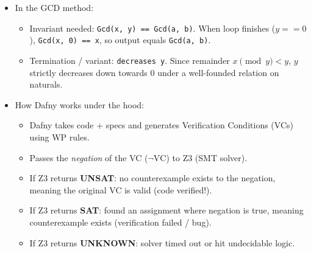 \begin{itemize}
    \item In the GCD method:
    \begin{itemize}
        \item Invariant needed: \texttt{Gcd(x, y) == Gcd(a, b)}. When loop finishes ($y == 0$), \texttt{Gcd(x, 0) == x}, so output equals \texttt{Gcd(a, b)}.
        \item Termination / variant: \texttt{decreases y}. Since remainder $x \pmod y < y$, $y$ strictly decreases down towards 0 under a well-founded relation on naturals.
    \end{itemize}

    \item How Dafny works under the hood:
    \begin{itemize}
        \item Dafny takes code + specs and generates Verification Conditions (VCs) using WP rules.
        \item Passes the \emph{negation} of the VC ($\neg \text{VC}$) to Z3 (SMT solver).
        \item If Z3 returns \textbf{UNSAT}: no counterexample exists to the negation, meaning the original VC is valid (code verified!).
        \item If Z3 returns \textbf{SAT}: found an assignment where negation is true, meaning counterexample exists (verification failed / bug).
        \item If Z3 returns \textbf{UNKNOWN}: solver timed out or hit undecidable logic.
    \end{itemize}
\end{itemize}
